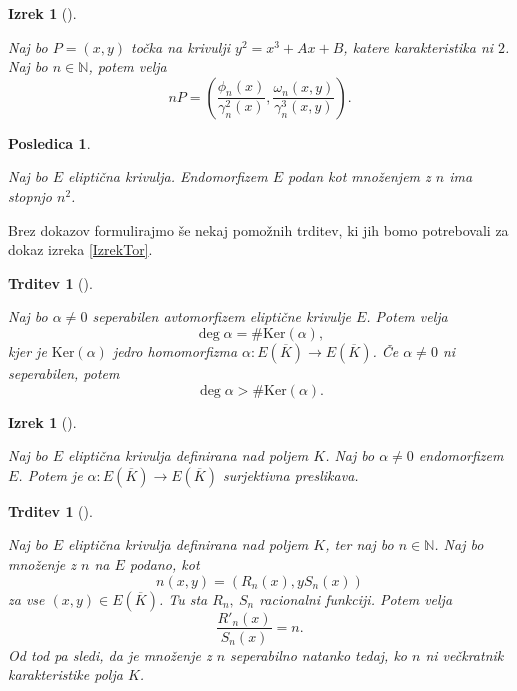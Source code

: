 \documentclass[12pt,a4paper,twoside]{article}
\theoremstyle{definition} %
\theoremstyle{plain} %
\newtheorem{izrek}[definicija]{Izrek}
\newtheorem{trditev}[definicija]{Trditev}
\newtheorem{posledica}[definicija]{Posledica}
\numberwithin{equation}{section}  %
\newcommand{\N}{\mathbb N}
\newcommand{\E}[1]{E({#1})}
\begin{document}
\begin{izrek}[]~

\label{izrek:3.6}
Naj bo $P = (x,y)$ točka na krivulji $y^2 = x^3+Ax+B$, katere karakteristika ni $2$. Naj bo $n\in \N$, potem velja
$$nP = \left( \frac{\phi_n(x)}{\gamma^2_n(x)}, \frac{\omega_n(x,y)}{\gamma^3_n(x,y)}\right).$$


\end{izrek}

\begin{posledica}~

\label{posledica:3.7}
Naj bo $E$ eliptična krivulja. Endomorfizem $E$ podan kot množenjem z $n$ ima stopnjo $n^2$.
\end{posledica}

Brez dokazov formulirajmo še nekaj pomožnih trditev, ki jih bomo potrebovali za dokaz izreka \ref{IzrekTor}.

\begin{trditev}[]~

\label{trditev:2.21}
Naj bo $\alpha \neq 0$ seperabilen avtomorfizem eliptične krivulje $E$. Potem velja
$$\deg \alpha = \# \text{Ker}(\alpha), $$
kjer je $\text{Ker}(\alpha)$ jedro homomorfizma $\alpha: \E{\overline{K}} \rightarrow \E{\overline{K}}$.
Če $\alpha \neq 0$ ni seperabilen, potem
$$\deg \alpha >  \# \text{Ker}(\alpha).$$

\end{trditev}

\begin{izrek}[]~

\label{izrek:2.22}
Naj bo $E$ eliptična krivulja definirana nad poljem $K$. Naj bo $\alpha \neq 0$ endomorfizem $E$. Potem je $\alpha: \E{\overline{K}} \rightarrow \E{\overline{K}}$ surjektivna preslikava.

\end{izrek}

\begin{trditev}[]~

\label{trditev:2.28}
Naj bo $E$ eliptična krivulja definirana nad poljem $K$, ter naj bo $n\in \N$. Naj bo množenje z $n$ na $E$ podano, kot
$$n(x,y) = (R_n(x),yS_n(x))$$
za vse $(x,y) \in \E{\overline{K}}$. Tu sta $R_n,\ S_n$ racionalni funkciji. Potem velja
$$\frac{R'_n(x)}{S_n(x)} = n.$$
Od tod pa sledi, da je množenje z $n$ seperabilno natanko tedaj, ko $n$ ni večkratnik karakteristike polja $K$. 
\end{trditev}
\end{document}
